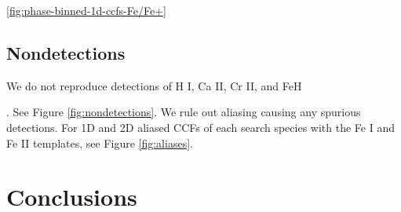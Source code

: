 \documentclass[twocolumn]{aastex631}
\begin{document}
        \ref{fig:phase-binned-1d-ccfs-Fe/Fe+}

                    
        \subsection{Nondetections}\label{subsec:Nondetections}
        
            We do not reproduce detections of H I, Ca II, Cr II, and FeH 
        
            \citep{CasasayasBarris2019, Nugroho2020, Hoeijmakers2020, Kesseli2020}. See Figure \ref{fig:nondetections}. We rule out aliasing causing any spurious detections. For 1D and 2D aliased CCFs of each search species with the Fe I and Fe II templates, see Figure \ref{fig:aliases}.

    \section{Conclusions}\label{sec:Conclusions}


    \vspace{5mm}




\appendix  
\end{document}

